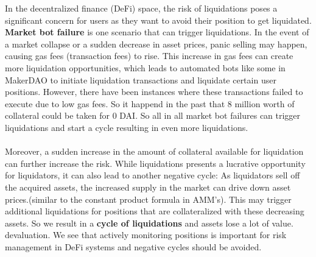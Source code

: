 \documentclass{article}
\begin{document}
In the decentralized finance (DeFi) space, the risk of liquidations poses a significant concern for users as they want to avoid their position to get liquidated. \textbf{Market bot failure} is one scenario that can trigger liquidations. In the event of a market collapse or a sudden decrease in asset prices, panic selling may happen, causing gas fees (transaction fees) to rise. This increase in gas fees can create more liquidation opportunities, which leads to automated bots like some in MakerDAO to initiate liquidation transactions and liquidate certain user positions. However, there have been instances where these transactions failed to execute due to low gas fees. So it happend in the past that 8 million worth of collateral could be taken for 0 DAI.  So all in all market bot failures can trigger liquidations and start a cycle resulting in even more liquidations. \\\\Moreover, a sudden increase in the amount of collateral available for liquidation can further increase the risk. While liquidations presents a lucrative opportunity for liquidators, it can also lead to another negative cycle:  As liquidators sell off the acquired assets, the increased supply in the market can drive down asset prices.(similar to the constant product formula in AMM's). This may trigger additional liquidations for positions that are collateralized with these decreasing assets. So we result in a  \textbf{cycle of liquidations} and assets lose a lot of value. devaluation. We see that actively monitoring positions is important for risk management in DeFi systems and negative cycles should be avoided.
\end{document}
